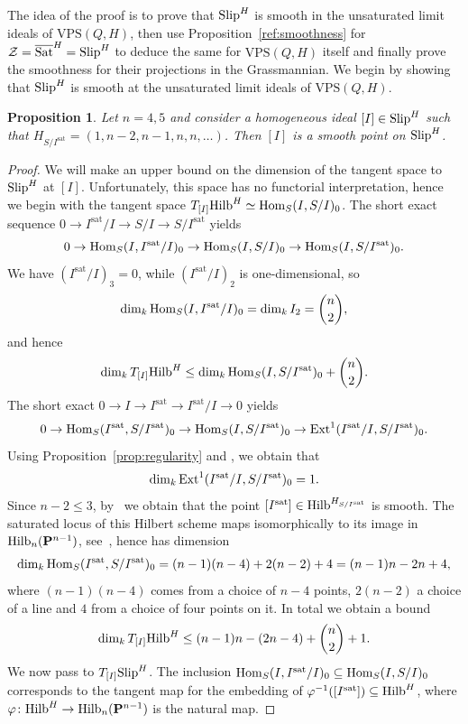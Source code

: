 \documentclass{amsart}
\newcommand{\Hilb}{{\rm{Hilb}}}
\newcommand{\Slip}{{\rm{Slip}}}
\newcommand{\Satbar}{\overline{\rm{Sat}}}
\newcommand{\Hom}{{\rm{Hom}}}
\newcommand{\Ext}{{\rm{Ext}}}
\newcommand{\PP}{{\bf P}}
\newcommand{\Hvanilla}{\Hilb_{n}(\PP^{n-1})}
\newcommand{\VPS}{\mathrm{VPS}(Q, H)}
\newcommand{\sat}{\mathrm{sat}}%
\newtheorem{proposition}[lemma]{\bf Proposition}
\begin{document}
The idea of the proof is to prove that $\Slip^H$ is smooth in the unsaturated
limit ideals of $\VPS$, then use Proposition~\ref{ref:smoothness} for
$\mathcal{Z} = \Satbar^H = \Slip^H$ to deduce the same for $\VPS$ itself and
finally prove the smoothness for their projections in the Grassmannian.
We begin by showing that $\Slip^H$ is smooth at
the unsaturated limit ideals of $\VPS$.
\begin{proposition}\label{prop:SlipSmooth}
    Let $n=4,5$ and consider a homogeneous ideal $[I]\in \Slip^H$ such that
    $H_{S/I^{\sat}} = (1,n-2, n-1, n, n,  \ldots )$. Then $[I]$ is a smooth point on $\Slip^H$.
\end{proposition}
\begin{proof}
    We will make an upper bound on the dimension of the tangent space to
    $\Slip^H$ at $[I]$. Unfortunately, this space has no functorial
    interpretation, hence we begin with the tangent space $T_{[I]}\Hilb^H
    \simeq \Hom_S(I, S/I)_{0}$.
    The short exact sequence $0\to I^{\sat}/I\to S/I\to S/I^{\sat}$ yields
    \[
        0\to \Hom_S(I, I^{\sat}/I)_0\to \Hom_S(I, S/I)_0\to
        \Hom_S(I, S/I^{\sat})_0.
    \]
    We have $(I^{\sat}/I)_3 = 0$, while $(I^{\sat}/I)_2$ is one-dimensional, so  
    $$\dim_{k}\Hom_S(I, I^{\sat}/I)_0=\dim_{k} I_2 =
    \binom{n}{2},$$
    and hence $$\dim_{k} T_{[I]}\Hilb^H\leq \dim_k\Hom_S(I, S/I^{\sat})_0+\binom{n}{2}.$$
    The short exact $0\to I\to I^{\sat}\to I^{\sat}/I\to 0$ yields
    \[
        0 \to \Hom_S(I^{\sat},
        S/I^{\sat})_0\to \Hom_S(I, S/I^{\sat})_0 \to \Ext^1(I^{\sat}/I,
        S/I^{\sat})_0.
    \]
    Using Proposition~\ref{prop:regularity} and \cite[Example~4.1]{JM}, we obtain
    that
    \[
        \dim_{k} \Ext^1(I^{\sat}/I, S/I^{\sat})_0 = 1.
    \]
    Since $n-2\leq 3$,
    by~\cite[Corollary~3.16]{JM} we obtain that the point $[I^{\sat}]\in
    \Hilb^{H_{S/I^{\sat}}}$ is smooth. The saturated locus of this Hilbert
    scheme maps isomorphically to its image in $\Hvanilla$,
    see~\cite[Proposition~3.9]{JM}, hence has dimension 
    $$\dim_k\Hom_S(I^{\sat},
        S/I^{\sat})_0=(n-1)(n-4) + 2(n-2)
    + 4 = (n-1)n - 2n+4,$$ where $(n-1)(n-4)$ comes from a choice of $n-4$
    points, $2(n-2)$ a choice of a line and $4$ from a choice of four points
    on it.
    In total we obtain a bound
    \begin{equation}\label{eq:tangentBound}
        \dim_{k} T_{[I]}\Hilb^H \leq (n-1)n - (2n-4) + \binom{n}{2} + 1.
    \end{equation}
    We now pass to $T_{[I]}\Slip^H$. The inclusion
    $\Hom_S(I, I^{\sat}/I)_{0} \subseteq \Hom_S(I, S/I)_0$ corresponds to the
    tangent map for the embedding of $\varphi^{-1}([I^{\sat}])\subseteq \Hilb^H$,
    where $\varphi\colon \Hilb^H\to \Hvanilla$ is the natural map.


\end{proof}
\end{document}
